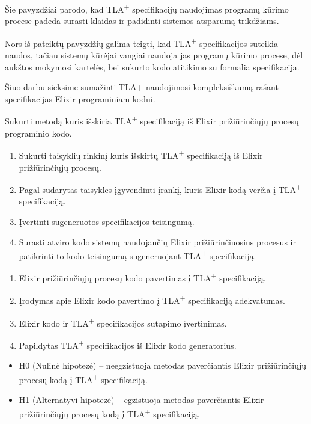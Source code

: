 \documentclass{VUMIFPSmagistrinis}
\begin{document}
        Šie pavyzdžiai parodo, kad TLA\textsuperscript{+} specifikacijų naudojimas programų kūrimo procese padeda surasti klaidas ir padidinti sistemos atsparumą trikdžiams.

        Nors iš pateiktų pavyzdžių galima teigti, kad TLA\textsuperscript{+} specifikacijos suteikia naudos, tačiau sistemų kūrėjai vangiai naudoja jas programų kūrimo procese, dėl aukštos mokymosi
        kartelės, bei sukurto kodo atitikimo su formalia specifikacija.

        Šiuo darbu sieksime sumažinti TLA+ naudojimosi kompleksiškumą rašant specifikacijas Elixir programiniam kodui.

	
		Sukurti metodą kuris išskiria TLA\textsuperscript{+} specifikaciją iš Elixir prižiūrinčiųjų procesų programinio kodo.

	
		\begin{enumerate}
			\item{Sukurti taisyklių rinkinį kuris išskirtų TLA\textsuperscript{+} specifikaciją iš Elixir prižiūrinčiųjų procesų.}
			\item{Pagal sudarytas taisykles įgyvendinti įrankį, kuris Elixir kodą verčia į TLA\textsuperscript{+} specifikaciją.}
			\item{Įvertinti sugeneruotos specifikacijos teisingumą.}
			\item{Surasti atviro kodo sistemų naudojančių Elixir prižiūrinčiuosius procesus ir patikrinti to kodo teisingumą sugeneruojant TLA\textsuperscript{+} specifikaciją.}
		\end{enumerate}
	
		\begin{enumerate}
			\item{Elixir prižiūrinčiųjų procesų kodo pavertimas į TLA\textsuperscript{+} specifikaciją.}
			\item{Įrodymas apie Elixir kodo pavertimo į TLA\textsuperscript{+} specifikaciją adekvatumas.}
			\item{Elixir kodo ir TLA\textsuperscript{+} specifikacijos sutapimo įvertinimas.}
			\item{Papildytas TLA\textsuperscript{+} specifikacijos iš Elixir kodo generatorius.}
		\end{enumerate}

		\begin{itemize}
			\item H0 (Nulinė hipotezė) -- neegzistuoja metodas paverčiantis Elixir prižiūrinčiųjų procesų kodą į TLA\textsuperscript{+} specifikaciją.
			\item H1 (Alternatyvi hipotezė) -- egzistuoja metodas paverčiantis Elixir prižiūrinčiųjų procesų kodą į TLA\textsuperscript{+} specifikaciją.
		\end{itemize}
		
	\pagebreak
	\printbibliography[heading=bibintoc] 
\end{document}
